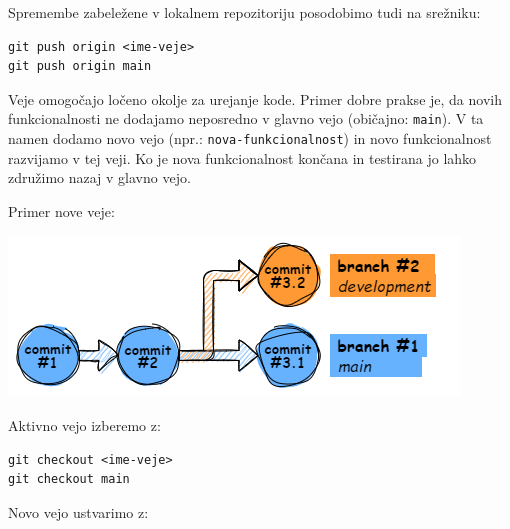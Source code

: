 \documentclass{article}
\begin{document}
\begin{multicols*}{2}
\begin{textbox}[4blue]
Spremembe zabeležene v lokalnem repozitoriju posodobimo tudi na srežniku:
\end{textbox}

\begin{codebox}[4blue]
\begin{lstlisting}
git push origin <ime-veje>
git push origin main
\end{lstlisting}
\end{codebox}

\vfill\null
\columnbreak

\begin{minipage}{\columnwidth}
\begin{textbox}[black]
Veje omogočajo ločeno okolje za urejanje kode. Primer dobre prakse je, da novih funkcionalnosti ne dodajamo neposredno v glavno vejo (običajno: \lstinline{main}). V ta namen dodamo novo vejo (npr.: \lstinline{nova-funkcionalnost}) in novo funkcionalnost razvijamo v tej veji. Ko je nova funkcionalnost končana in testirana jo lahko združimo nazaj v glavno vejo.

Primer nove veje:
\begin{center}
\includegraphics[width=\linewidth]{images/git-branches-checkout.png}
\end{center}
\end{textbox}

\begin{textbox}[black]
Aktivno vejo izberemo z:
\end{textbox}

\begin{codebox}[black]
\begin{lstlisting}
git checkout <ime-veje>
git checkout main
\end{lstlisting}
\end{codebox}

\begin{textbox}[black]
Novo vejo ustvarimo z:
\end{textbox}


\end{minipage}
\end{multicols*}
\end{document}
